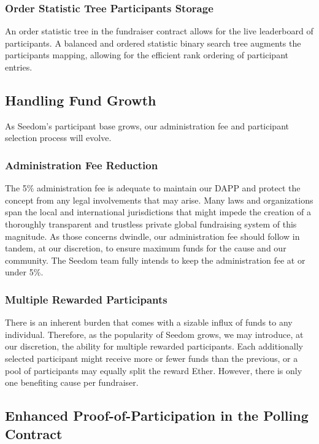 \documentclass[11pt]{article}
\begin{document}
\subsubsection{Order Statistic Tree Participants Storage}

An order statistic tree \cite{5} in the fundraiser contract allows for the live leaderboard of participants. A balanced and ordered statistic binary search tree augments the participants mapping, allowing for the efficient rank ordering of participant entries.

\subsection{Handling Fund Growth}

As Seedom's participant base grows, our administration fee and participant selection process will evolve.

\subsubsection{Administration Fee Reduction}

The 5\% administration fee is adequate to maintain our DAPP and protect the concept from any legal involvements that may arise. Many laws and organizations span the local and international jurisdictions that might impede the creation of a thoroughly transparent and trustless private global fundraising system of this magnitude. As those concerns dwindle, our administration fee should follow in tandem, at our discretion, to ensure maximum funds for the cause and our community. The Seedom team fully intends to keep the administration fee at or under 5\%.

\subsubsection{Multiple Rewarded Participants}

There is an inherent burden that comes with a sizable influx of funds to any individual. Therefore, as the popularity of Seedom grows, we may introduce, at our discretion, the ability for multiple rewarded participants. Each additionally selected participant might receive more or fewer funds than the previous, or a pool of participants may equally split the reward Ether. However, there is only one benefiting cause per fundraiser.

\subsection{Enhanced Proof-of-Participation in the Polling Contract}
\label{sec:enhancedProofOfParticipationInThePollingContract}
\end{document}
